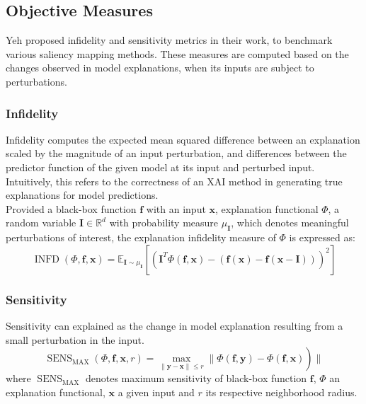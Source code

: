 \documentclass[../report.tex]{subfiles}
\begin{document}
    \subsection{Objective Measures}
    Yeh \etal \cite{yeh2019fidelity} proposed infidelity and sensitivity metrics in their work, to benchmark various saliency mapping methods. These measures are computed based on the changes observed in model explanations, when its inputs are subject to perturbations. 
    \subsubsection{Infidelity}
    Infidelity computes the expected mean squared difference between an explanation scaled by the magnitude of an input perturbation, and differences between the predictor function of the given model at its input and perturbed input. Intuitively, this refers to the correctness of an XAI method in generating true explanations for model predictions.\\
    Provided a black-box function $\mathbf{f}$ with an input $\mathbf{x}$, explanation functional $\Phi$, a random variable $\mathbf{I} \in \mathbb{R}^d$ with probability measure $\mu_{\mathbf{I}}$, which denotes meaningful perturbations of interest, the explanation infidelity measure of $\Phi$ is expressed as:
    \begin{equation}
    	\operatorname{INFD}(\Phi, \mathbf{f}, \mathbf{x})=\mathbb{E}_{\mathbf{I} \sim \mu_{\mathbf{I}}}\left[\left(\mathbf{I}^T \Phi(\mathbf{f}, \mathbf{x})-(\mathbf{f}(\mathbf{x})-\mathbf{f}(\mathbf{x}-\mathbf{I}))\right)^2\right]
    \end{equation}
    \subsubsection{Sensitivity}
    Sensitivity can explained as the change in model explanation resulting from a small perturbation in the input.
      \begin{equation}
    	\left.\operatorname{SENS}_{\mathrm{MAX}}(\Phi, \mathbf{f}, \mathbf{x}, r)=\max _{\|\mathbf{y}-\mathbf{x}\| \leqslant r} \| \Phi(\mathbf{f}, \mathbf{y})-\Phi(\mathbf{f}, \mathbf{x})\right) \|
    \end{equation}
    where $\operatorname{SENS}_{\mathrm{MAX}}$ denotes maximum sensitivity of black-box function $\mathbf{f}$, $\Phi$ an explanation functional, $\mathbf{x}$ a given input and $r$ its respective neighborhood radius.
    
\end{document}
